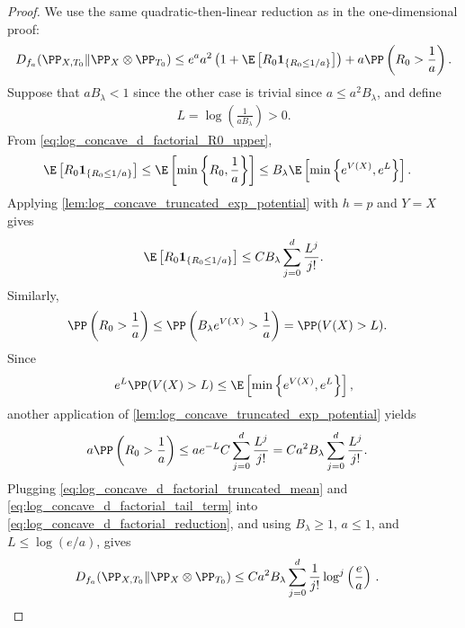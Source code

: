 \begin{proof}
    We use the same quadratic-then-linear reduction as in the one-dimensional
    proof:
    \begin{align}
        D_{f_a}(\PP_{X,T_0}\|\PP_X\otimes\PP_{T_0})
        \le
        e^a
        a^2
        \left(
        1+
        \E\left[
            R_0\mathbf{1}_{\{R_0\le 1/a\}}
            \right]
        \right)
        +
        a\PP\left(R_0>\frac1a\right).
        \label{eq:log_concave_d_factorial_reduction}
    \end{align}
    Suppose that $aB_\lambda<1$ since the other case is trivial since $a\le a^2B_\lambda$, and define
    \begin{align}
        L=\log\left(\frac{1}{aB_\lambda}\right)>0.
    \end{align}
    From \eqref{eq:log_concave_d_factorial_R0_upper},
    \begin{align}
        \E\left[
            R_0\mathbf{1}_{\{R_0\le 1/a\}}
            \right]
         & \le
        \E\left[
            \min\left\{R_0,\frac1a\right\}
            \right]
        \le
        B_\lambda
        \E\left[
            \min\left\{e^{V(X)},e^L\right\}
            \right].
    \end{align}
    Applying \cref{lem:log_concave_truncated_exp_potential} with $h=p$ and
    $Y=X$ gives
    \begin{align}
        \E\left[
            R_0\mathbf{1}_{\{R_0\le 1/a\}}
            \right]
        \le
        C B_\lambda
        \sum_{j=0}^d \frac{L^j}{j!}.
        \label{eq:log_concave_d_factorial_truncated_mean}
    \end{align}
    Similarly,
    \begin{align}
        \PP\left(R_0>\frac1a\right)
         & \le
        \PP\left(B_\lambda e^{V(X)}>\frac1a\right)
        =
        \PP(V(X)>L).
    \end{align}
    Since
    \begin{align}
        e^L\PP(V(X)>L)
        \le
        \E\left[
            \min\left\{e^{V(X)},e^L\right\}
            \right],\label{ineq:F_L_is_high_probability_for_X}
    \end{align}
    another application of \cref{lem:log_concave_truncated_exp_potential}
    yields
    \begin{align}
        a\PP\left(R_0>\frac1a\right)
         & \le
        ae^{-L}
        C
        \sum_{j=0}^d \frac{L^j}{j!}
        =
        C a^2B_\lambda
        \sum_{j=0}^d \frac{L^j}{j!}.
        \label{eq:log_concave_d_factorial_tail_term}
    \end{align}
    Plugging \eqref{eq:log_concave_d_factorial_truncated_mean} and
    \eqref{eq:log_concave_d_factorial_tail_term} into
    \eqref{eq:log_concave_d_factorial_reduction}, and using
    $B_\lambda\ge1$, $a\le1$, and $L\le \log(e/a)$, gives
    \begin{align}
        D_{f_a}(\PP_{X,T_0}\|\PP_X\otimes\PP_{T_0})
         & \le
        C a^2B_\lambda
        \sum_{j=0}^d
        \frac{1}{j!}
        \log^j\left(\frac{e}{a}\right)\,.
    \end{align}
\end{proof}

